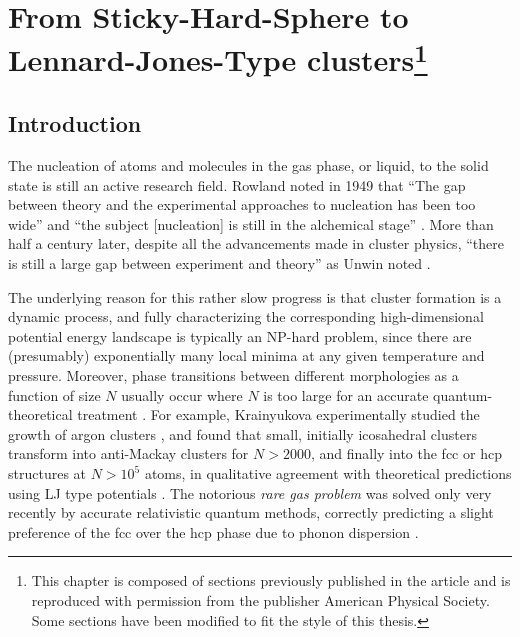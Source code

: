 \chapter[From Sticky-Hard-Sphere to Lennard-Jones-Type Clusters]{From
    Sticky-Hard-Sphere to Lennard-Jones-Type clusters\footnote{This chapter is
    composed of sections previously published in the article
    \autocite{Trombach_stickyhardsphereLennardJonestypeclusters_2018}
    and is reproduced with permission from the publisher 
    American Physical Society. Some sections have been modified to fit the style
    of this thesis.}}
\label{sec:fromstickyhardspheretoLJtypeclusters}

\section{Introduction}

The nucleation of atoms and molecules in the gas phase, or liquid, to the solid
state is still an active research
field\autocite{Stillinger_Packingstructurestransitions_1984,
Martin-1996,Wales-1996, Vlieg_atomicscaleunderstandingcrystal_2007, Arkus-2010,
Woodley-2010, Karthika-2016, Holmes-Cerfon_StickySphereClusters_2017}. Rowland
noted in 1949 that ``The gap between theory and the experimental approaches to
nucleation has been too wide'' and ``the subject [nucleation] is still in the
alchemical stage'' \autocite{Rowland-1949}. More than half a century later,
despite all the advancements made in cluster physics, ``there is still a large
gap between experiment and theory'' as Unwin noted \autocite{Unwin-2007}.

The underlying reason for this rather slow progress is that cluster formation
is a dynamic process, and fully characterizing the corresponding
high-dimensional potential energy landscape is typically an NP-hard problem,
since there are (presumably) exponentially many local minima at any given
temperature and pressure\autocite{Stillinger_Packingstructurestransitions_1984,
Oganov-2006, Massen_Powerlawdistributionsareas_2007, wales10, Oganov-2011,
calvo12, Wales-2015}.  Moreover, phase transitions between different
morphologies as a function of size $N$ usually occur where $N$ is too large for
an accurate quantum-theoretical treatment \autocite{Waal89,
Cleveland_energeticsstructurenickel_1991, vandewaal96a, Doye-1995,
vandeWaalTd00}.  For example, Krainyukova experimentally studied the growth of
argon clusters \autocite{Krainyukova-2012}, and found that small, initially
icosahedral clusters transform into anti-Mackay clusters for $N>2000$, and
finally into the \ac{fcc} or \ac{hcp} structures at $N>10^5$ atoms, in
qualitative agreement with theoretical predictions using \ac{LJ} type
potentials \autocite{Martin-1996,
Schwerdtfeger_ExtensionLennardJonespotential_2006, Krainyukova-2007}.  The
notorious \textit{rare gas problem} was solved only very recently by accurate
relativistic quantum methods, correctly predicting a slight preference of the
\ac{fcc} over the hcp phase due to phonon dispersion \autocite{Schwerdtfeger-2016}.

